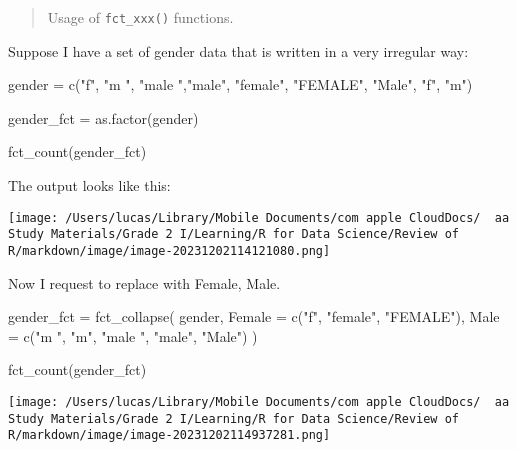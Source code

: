 \documentclass[
]{article}
\let\oldincludegraphics\includegraphics
\renewcommand{\includegraphics}[2][]{\begin{center}\oldincludegraphics[#1]{#2}\end{center}}
\newenvironment{Shaded}{}{}
\newcommand{\AttributeTok}[1]{\textcolor[rgb]{0.49,0.56,0.16}{#1}}
\newcommand{\FunctionTok}[1]{\textcolor[rgb]{0.02,0.16,0.49}{#1}}
\newcommand{\NormalTok}[1]{#1}
\newcommand{\OtherTok}[1]{\textcolor[rgb]{0.00,0.44,0.13}{#1}}
\newcommand{\StringTok}[1]{\textcolor[rgb]{0.25,0.44,0.63}{#1}}
\begin{document}
\begin{quote}
Usage of \texttt{fct\_xxx()} functions.
\end{quote}

Suppose I have a set of gender data that is written in a very irregular
way:

\begin{Shaded}
\begin{Highlighting}[]
\NormalTok{gender }\OtherTok{=}
	\FunctionTok{c}\NormalTok{(}\StringTok{"f"}\NormalTok{, }\StringTok{"m "}\NormalTok{, }\StringTok{"male "}\NormalTok{,}\StringTok{"male"}\NormalTok{, }\StringTok{"female"}\NormalTok{, }\StringTok{"FEMALE"}\NormalTok{, }\StringTok{"Male"}\NormalTok{, }\StringTok{"f"}\NormalTok{, }\StringTok{"m"}\NormalTok{)}

\NormalTok{gender\_fct }\OtherTok{=}
  \FunctionTok{as.factor}\NormalTok{(gender)}

\FunctionTok{fct\_count}\NormalTok{(gender\_fct)}
\end{Highlighting}
\end{Shaded}

The output looks like this:

\texttt{[image: /Users/lucas/Library/Mobile Documents/com~apple~CloudDocs/~~aa Study Materials/Grade 2 I/Learning/R for Data Science/Review of R/markdown/image/image-20231202114121080.png]}

Now I request to replace with Female, Male.

\begin{Shaded}
\begin{Highlighting}[]
\NormalTok{gender\_fct }\OtherTok{=}
  \FunctionTok{fct\_collapse}\NormalTok{(}
\NormalTok{    gender,}
    \AttributeTok{Female =} \FunctionTok{c}\NormalTok{(}\StringTok{"f"}\NormalTok{, }\StringTok{"female"}\NormalTok{, }\StringTok{"FEMALE"}\NormalTok{),}
    \AttributeTok{Male =} \FunctionTok{c}\NormalTok{(}\StringTok{"m "}\NormalTok{, }\StringTok{"m"}\NormalTok{, }\StringTok{"male "}\NormalTok{, }\StringTok{"male"}\NormalTok{, }\StringTok{"Male"}\NormalTok{)}
\NormalTok{  )}

\FunctionTok{fct\_count}\NormalTok{(gender\_fct)}
\end{Highlighting}
\end{Shaded}

\texttt{[image: /Users/lucas/Library/Mobile Documents/com~apple~CloudDocs/~~aa Study Materials/Grade 2 I/Learning/R for Data Science/Review of R/markdown/image/image-20231202114937281.png]}
\end{document}
